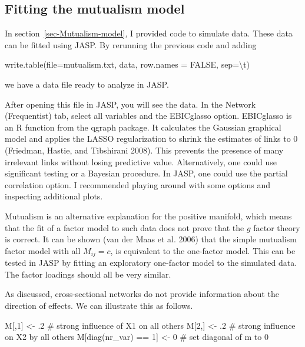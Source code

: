 \documentclass[
  a4paper,
  DIV=11,
  numbers=noendperiod,
  oneside]{scrreprt}
\newenvironment{Shaded}{}{}
\newcommand{\AttributeTok}[1]{\textcolor[rgb]{0.84,0.23,0.29}{#1}}
\newcommand{\CommentTok}[1]{\textcolor[rgb]{0.42,0.45,0.49}{#1}}
\newcommand{\ConstantTok}[1]{\textcolor[rgb]{0.00,0.36,0.77}{#1}}
\newcommand{\DecValTok}[1]{\textcolor[rgb]{0.00,0.36,0.77}{#1}}
\newcommand{\FunctionTok}[1]{\textcolor[rgb]{0.44,0.26,0.76}{#1}}
\newcommand{\NormalTok}[1]{\textcolor[rgb]{0.14,0.16,0.18}{#1}}
\newcommand{\OtherTok}[1]{\textcolor[rgb]{0.44,0.26,0.76}{#1}}
\newcommand{\SpecialCharTok}[1]{\textcolor[rgb]{0.00,0.36,0.77}{#1}}
\newcommand{\StringTok}[1]{\textcolor[rgb]{0.01,0.18,0.38}{#1}}
\begin{document}
\subsection{Fitting the mutualism
model}\label{sec-Fitting-the-mutualism-model}

In section~\ref{sec-Mutualism-model}, I provided code to simulate data.
These data can be fitted using JASP. By rerunning the previous code and
adding

\begin{Shaded}
\begin{Highlighting}[]
\FunctionTok{write.table}\NormalTok{(}\AttributeTok{file=}\StringTok{\textquotesingle{}mutualism.txt\textquotesingle{}}\NormalTok{, data, }\AttributeTok{row.names =} \ConstantTok{FALSE}\NormalTok{, }\AttributeTok{sep=}\StringTok{\textquotesingle{}}\SpecialCharTok{\textbackslash{}t}\StringTok{\textquotesingle{}}\NormalTok{)}
\end{Highlighting}
\end{Shaded}

we have a data file ready to analyze in JASP.

After opening this file in JASP, you will see the data. In the Network
(Frequentist) tab, select all variables and the EBICglasso option.
EBICglasso is an R function from the qgraph package. It calculates the
Gaussian graphical model and applies the LASSO regularization to shrink
the estimates of links to 0 (Friedman, Hastie, and Tibshirani 2008).
This prevents the presence of many irrelevant links without losing
predictive value. Alternatively, one could use significant testing or a
Bayesian procedure. In JASP, one could use the partial correlation
option. I recommended playing around with some options and inspecting
additional plots.

Mutualism is an alternative explanation for the positive manifold, which
means that the fit of a factor model to such data does not prove that
the \(g\) factor theory is correct. It can be shown (van der Maas et al.
2006) that the simple mutualism factor model with all \(M_{ij} = c\), is
equivalent to the one-factor model. This can be tested in JASP by
fitting an exploratory one-factor model to the simulated data. The
factor loadings should all be very similar.

As discussed, cross-sectional networks do not provide information about
the direction of effects. We can illustrate this as follows.

\begin{Shaded}
\begin{Highlighting}[]
\NormalTok{M[,}\DecValTok{1}\NormalTok{] }\OtherTok{\textless{}{-}}\NormalTok{ .}\DecValTok{2} \CommentTok{\# strong influence of X1 on all others}
\NormalTok{M[}\DecValTok{2}\NormalTok{,] }\OtherTok{\textless{}{-}}\NormalTok{ .}\DecValTok{2} \CommentTok{\# strong influence on X2 by all others}
\NormalTok{M[}\FunctionTok{diag}\NormalTok{(nr\_var) }\SpecialCharTok{==} \DecValTok{1}\NormalTok{] }\OtherTok{\textless{}{-}} \DecValTok{0} \CommentTok{\# set diagonal of m to 0}
\end{Highlighting}
\end{Shaded}
\end{document}
